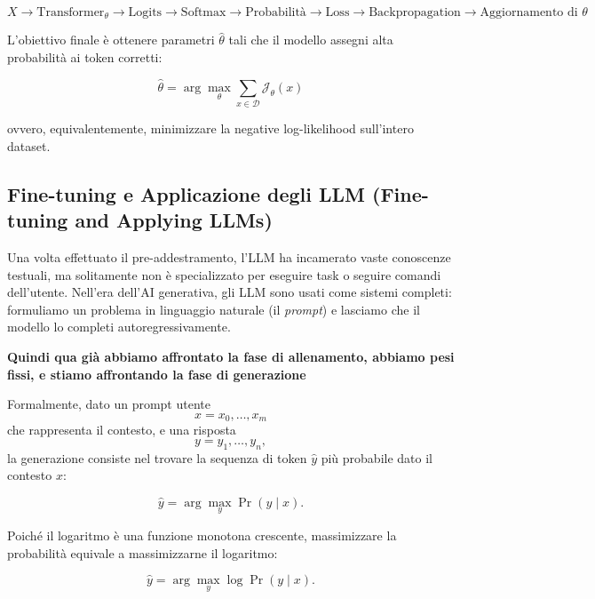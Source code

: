 \begin{equation}
\boxed{
X
\rightarrow
\text{Transformer}_\theta
\rightarrow
\text{Logits}
\rightarrow
\text{Softmax}
\rightarrow
\text{Probabilità}
\rightarrow
\text{Loss}
\rightarrow
\text{Backpropagation}
\rightarrow
\text{Aggiornamento di }\theta
}
\end{equation}

L'obiettivo finale è ottenere parametri $\hat{\theta}$ tali che il
modello assegni alta probabilità ai token corretti:

\begin{equation}
\boxed{
\hat{\theta}
=
\arg\max_\theta
\sum_{x\in\mathcal{D}}
\mathcal{J}_\theta(x)
}
\end{equation}

ovvero, equivalentemente, minimizzare la negative log-likelihood
sull'intero dataset.

\subsection{Fine-tuning e Applicazione degli LLM (Fine-tuning and Applying LLMs)}



Una volta effettuato il pre-addestramento, l'LLM ha incamerato vaste conoscenze testuali, ma solitamente non è specializzato per eseguire task o seguire comandi dell'utente. Nell'era dell'AI generativa, gli LLM sono usati come sistemi completi: formuliamo un problema in linguaggio naturale (il \textit{prompt}) e lasciamo che il modello lo completi autoregressivamente.

\textbf{Quindi qua già abbiamo affrontato la fase di allenamento, abbiamo pesi fissi, e stiamo affrontando la fase di generazione}

Formalmente, dato un prompt utente
\[
x = x_0,\ldots,x_m
\]
che rappresenta il contesto, e una risposta
\[
y = y_1,\ldots,y_n,
\]
la generazione consiste nel trovare la sequenza di token $\hat{y}$ più probabile dato il contesto $x$:

\begin{equation}
\hat{y}
=
\arg\max_y \Pr(y\mid x).
\end{equation}

Poiché il logaritmo è una funzione monotona crescente, massimizzare la probabilità equivale a massimizzarne il logaritmo:

\begin{equation}
\hat{y}
=
\arg\max_y \log \Pr(y\mid x).
\end{equation}


